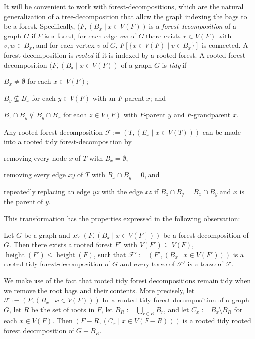 \documentclass{patmorin}
\renewcommand{\le}{\leqslant}
\newcommand{\pat}[1]{\noindent\textcolor{Magenta}{PaMo: #1}}
\newcommand{\piotr}[1]{\noindent\textcolor{red}{PiMi: #1}}
\newcommand{\defin}[1]{\emph{\textcolor{brightmaroon}{#1}}}
\DeclareMathOperator{\height}{height}
\newcommand{\calF}{\mathcal{F}}
\begin{document}
  It will be convenient to work with forest-decompositions, which are the natural generalization of a tree-decomposition that allow the graph indexing the bags to be a forest.  Specifically, $(F,(B_x\mid x\in V(F))$ is a \defin{forest-decomposition} of a graph $G$ if $F$ is a forest, for each edge $vw$ of $G$ there exists $x\in V(F)$ with $v,w\in B_x$, and for each vertex $v$ of $G$, $F[\{x\in V(F)\mid v\in B_x\}]$ is connected.  A forest decomposition is \defin{rooted} if it is indexed by a rooted forest.  A rooted forest-decomposition $(F,(B_x\mid x\in V(F))$ of a graph $G$ is \defin{tidy} if
  \begin{enumerate*}[label=(\arabic*)]
  \item $B_x\neq\emptyset$ for each $x\in V(F)$;
  \item $B_y\not\subseteq B_x$ for each $y\in V(F)$ with an $F$-parent $x$; and
  \item $B_z \cap B_y \not\subseteq B_y\cap B_x$ for each $z\in V(F)$ with $F$-parent $y$ and $F$-grandparent $x$.
  \end{enumerate*}
  Any rooted forest-decomposition $\calF:=(T,(B_x\mid x\in V(T)))$ can be made into a rooted tidy forest-decomposition by
  \begin{enumerate*}[label=(\arabic*)]
  \item removing every node $x$ of $T$ with $B_x=\emptyset$,
  \item removing every edge $xy$ of $T$ with $B_x\cap B_y=0$, and
  \item repeatedly replacing an edge $yz$ with the edge $xz$ if $B_z\cap B_y=B_x\cap B_y$ and $x$ is the parent of $y$.
  \end{enumerate*}

    This transformation has the properties expressed in the following observation:
  \begin{obs}\label{tidy_forest}
    Let $G$ be a graph and let $(F,(B_x\mid x\in V(F)))$ be a forest-decomposition of $G$. Then there exists a rooted forest $F'$ with $V(F')\subseteq V(F)$, $\height(F')\le\height(F)$, such that $\calF':=(F',(B_x\mid x\in V(F')))$ is a rooted tidy forest-decomposition of $G$ and every torso of $\calF'$ is a torso of $\calF$.
  \end{obs}
  We make use of the fact that rooted tidy forest decompositions remain tidy when we remove the root bags and their contents.  More precisely, let $\calF:=(F,(B_x\mid x\in V(F)))$ be a rooted tidy forest decomposition of a graph $G$, let $R$ be the set of roots in $F$, let $B_R:=\bigcup_{r\in R}B_r$, and let $C_x:=B_x\setminus B_R$ for each $x\in V(F)$.  Then $(F-R,(C_x\mid x\in V(F-R)))$ is a rooted tidy rooted forest decomposition of $G-B_R$.
\end{document}
